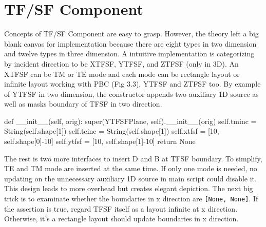 \section{TF/SF Component}
Concepts of TF/SF Component are easy to grasp. However, the theory left a big blank canvas for implementation because
there are eight types in two dimension and twelve types in three dimension. A intuitive implementation is categorizing
by incident direction to be XTFSF, YTFSF, and ZTFSF (only in 3D). An XTFSF can be TM or TE mode and each mode can be
rectangle layout or infinite layout working with PBC (Fig 3.3), YTFSF and ZTFSF too. By example of YTFSF in two
dimension, the constructor appends two auxiliary 1D source as well as masks boundary of TFSF in two direction. 
\begin{code}
    def __init__(self, orig):
        super(YTFSFPlane, self).__init__(orig)
        self.tminc = String(self.shape[1])
        self.teinc = String(self.shape[1])
        self.xtfsf = [10, self.shape[0]-10]
        self.ytfsf = [10, self.shape[1]-10]
        return None
\end{code}
The rest is two more interfaces to insert D and B at TFSF boundary. To simplify, TE and TM mode are inserted at the same
time. If only one mode is needed, no updating on the unnecessary auxiliary 1D source in main script could disable
it. This design leads to more overhead but creates elegant depiction. The next big trick is to examinate whether the
boundaries in x direction are \texttt{[None, None]}. If the assertion is true, regard TFSF itself as a layout infinite
at x direction. Otherwise, it's a rectangle layout should update boundaries in x direction.
